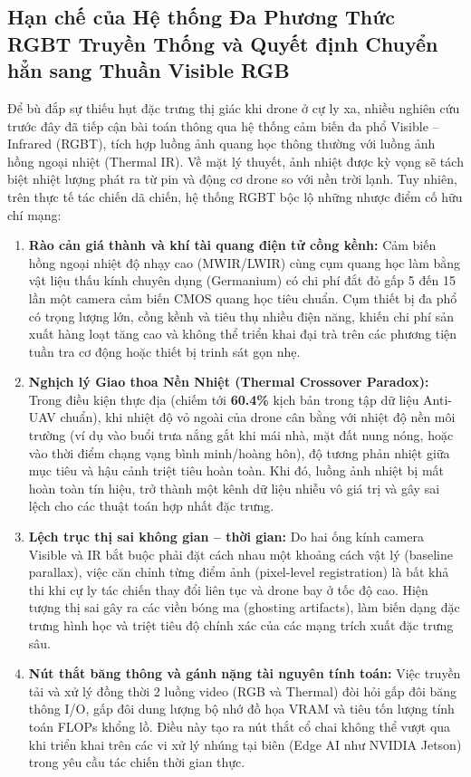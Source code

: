 \documentclass[11pt,a4paper]{article}
\begin{document}
\subsection{Hạn chế của Hệ thống Đa Phương Thức RGBT Truyền Thống và Quyết định Chuyển hẳn sang Thuần Visible RGB}
Để bù đắp sự thiếu hụt đặc trưng thị giác khi drone ở cự ly xa, nhiều nghiên cứu trước đây đã tiếp cận bài toán thông qua hệ thống cảm biến đa phổ Visible -- Infrared (RGBT), tích hợp luồng ảnh quang học thông thường với luồng ảnh hồng ngoại nhiệt (Thermal IR). Về mặt lý thuyết, ảnh nhiệt được kỳ vọng sẽ tách biệt nhiệt lượng phát ra từ pin và động cơ drone so với nền trời lạnh. Tuy nhiên, trên thực tế tác chiến dã chiến, hệ thống RGBT bộc lộ những nhược điểm cố hữu chí mạng:
\begin{enumerate}
    \item \textbf{Rào cản giá thành và khí tài quang điện tử cồng kềnh:} Cảm biến hồng ngoại nhiệt độ nhạy cao (MWIR/LWIR) cùng cụm quang học làm bằng vật liệu thấu kính chuyên dụng (Germanium) có chi phí đắt đỏ gấp 5 đến 15 lần một camera cảm biến CMOS quang học tiêu chuẩn. Cụm thiết bị đa phổ có trọng lượng lớn, cồng kềnh và tiêu thụ nhiều điện năng, khiến chi phí sản xuất hàng loạt tăng cao và không thể triển khai đại trà trên các phương tiện tuần tra cơ động hoặc thiết bị trinh sát gọn nhẹ.
    \item \textbf{Nghịch lý Giao thoa Nền Nhiệt (Thermal Crossover Paradox):} Trong điều kiện thực địa (chiếm tới \textbf{60.4\%} kịch bản trong tập dữ liệu Anti-UAV chuẩn), khi nhiệt độ vỏ ngoài của drone cân bằng với nhiệt độ nền môi trường (ví dụ vào buổi trưa nắng gắt khi mái nhà, mặt đất nung nóng, hoặc vào thời điểm chạng vạng bình minh/hoàng hôn), độ tương phản nhiệt giữa mục tiêu và hậu cảnh triệt tiêu hoàn toàn. Khi đó, luồng ảnh nhiệt bị mất hoàn toàn tín hiệu, trở thành một kênh dữ liệu nhiễu vô giá trị và gây sai lệch cho các thuật toán hợp nhất đặc trưng.
    \item \textbf{Lệch trục thị sai không gian -- thời gian:} Do hai ống kính camera Visible và IR bắt buộc phải đặt cách nhau một khoảng cách vật lý (baseline parallax), việc căn chỉnh từng điểm ảnh (pixel-level registration) là bất khả thi khi cự ly tác chiến thay đổi liên tục và drone bay ở tốc độ cao. Hiện tượng thị sai gây ra các viền bóng ma (ghosting artifacts), làm biến dạng đặc trưng hình học và triệt tiêu độ chính xác của các mạng trích xuất đặc trưng sâu.
    \item \textbf{Nút thắt băng thông và gánh nặng tài nguyên tính toán:} Việc truyền tải và xử lý đồng thời 2 luồng video (RGB và Thermal) đòi hỏi gấp đôi băng thông I/O, gấp đôi dung lượng bộ nhớ đồ họa VRAM và tiêu tốn lượng tính toán FLOPs khổng lồ. Điều này tạo ra nút thắt cổ chai không thể vượt qua khi triển khai trên các vi xử lý nhúng tại biên (Edge AI như NVIDIA Jetson) trong yêu cầu tác chiến thời gian thực.
\end{enumerate}
\end{document}
